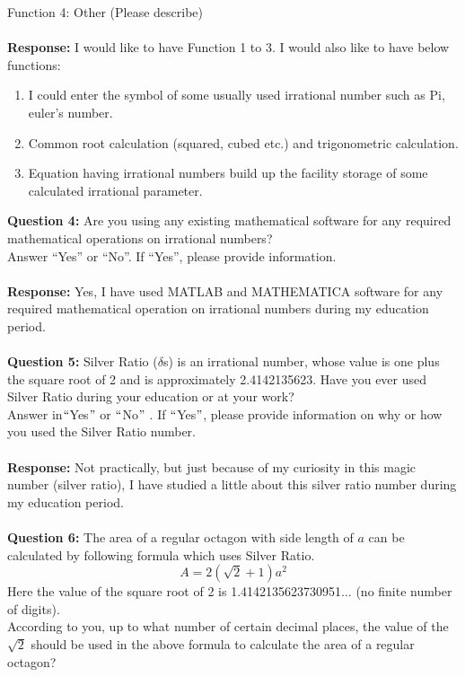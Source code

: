     Function 4: Other (Please describe) \\ \\
\textbf{Response:} I would like to have Function 1 to 3. I would also like to have below functions:
\begin{enumerate}
\item I could enter the symbol of some usually used irrational number such as Pi, euler's number.
\item Common root calculation (squared, cubed etc.) and trigonometric calculation.
\item Equation having irrational numbers build up the facility storage of some calculated irrational parameter.
\end{enumerate} 
\textbf{Question 4:} Are you using any existing mathematical software for any required mathematical operations on irrational numbers? \\
Answer “Yes” or “No”. If “Yes”, please provide information. \\ \\
\textbf{Response:} Yes, I have used MATLAB and MATHEMATICA software for any required mathematical operation on irrational numbers during my education period. \\ \\
\textbf{Question 5:} Silver Ratio ($ \delta $s) is an irrational number, whose value is one plus the square root of 2 and is approximately 2.4142135623. Have you ever used Silver Ratio during your education or at your work? \\
Answer in$``$Yes$"$  or $``$No$"$ . If $``$Yes$"$, please provide information on why or how you used the Silver Ratio number. \\ \\
\textbf{Response:} Not practically, but just because of my curiosity in this magic number (silver ratio), I have studied a little about this silver ratio number during my education period. \\ \\
\textbf{Question 6:} The area of a regular octagon with side length of $a$ can be calculated by following formula which uses Silver Ratio. 
\[ A = 2 (\sqrt{2} + 1) {a}^2 \]
Here the value of the square root of 2 is 1.4142135623730951$ \ldots $  (no finite number of digits). \\ According to you, up to what number of certain decimal places, the value of the \(\sqrt{2} \) should be used in the above formula to calculate the area of a regular octagon? \\ \\
